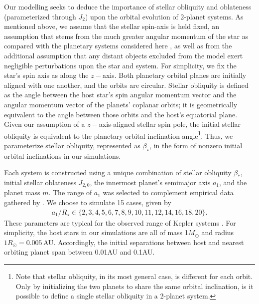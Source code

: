 \documentclass[twocolumn]{aastex63}
\begin{document}
Our modelling seeks to deduce the importance of stellar obliquity and oblateness (parameterized through $J_2$) upon the orbital evolution of 2-planet systems. As mentioned above, we assume that the stellar spin-axis is held fixed, an assumption that stems from the much greater angular momentum of the star as compared with the planetary systems considered here \citep{spalding2018resilience}, as well as from the additional assumption that any distant objects excluded from the model exert negligible perturbations upon the star and system. For simplicity, we fix the star's spin axis as along the $z-$axis. Both planetary orbital planes are initially aligned with one another, and the orbits are circular. Stellar obliquity is defined as the angle between the host star's spin angular momentum vector and the angular momentum vector of the planets’ coplanar orbits; it is geometrically equivalent to the angle between those orbits and the host’s equatorial plane. Given our assumption of a $z-$axis-aligned stellar spin pole, the initial stellar obliquity is equivalent to the planetary orbital inclination angle\footnote{Note that stellar obliquity, in its most general case, is different for each orbit. Only by initializing the two planets to share the same orbital inclination, is it possible to define a single stellar obliquity in a 2-planet system.}. Thus, we parameterize stellar obliquity, represented as $\beta_\star$, in the form of nonzero initial orbital inclinations in our simulations.

Each system is constructed using a unique combination of stellar obliquity \(\beta_*\), initial stellar oblateness \(J_{2,0}\), the innermost planet’s semimajor axis \(a_1\), and the  planet mass \(m\). The range of \(a_1\) was selected to complement empirical data gathered by \cite{dai2018larger}. We choose to simulate 15 cases, given by
\begin{align}
    a_1/R_\star \in \{ 2, 3, 4, 5, 6, 7, 8, 9,
    10, 11, 12, 14, 16, 18, 20 \}.
\end{align}
These parameters are typical for the observed range of Kepler systems \citep{akeson2013nasa}. For simplicity, the host stars in our simulations are all of mass 1\(M_\odot\) and radius $1R_\odot=0.005$\,AU. Accordingly, the initial separations between host and nearest orbiting planet span between 0.01AU and 0.1AU.
 
\end{document}
